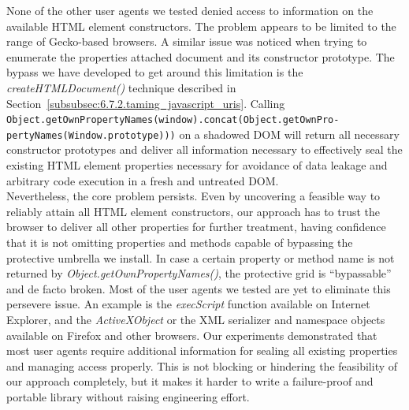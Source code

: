     None of the other user agents we tested denied access to information on the available HTML element constructors. The problem appears to be limited to the range of Gecko-based browsers. A similar issue was noticed when trying to enumerate the properties attached document and its constructor prototype. The bypass we have developed to get around this limitation is the \textit {createHTMLDocument()} technique described in Section~\ref{subsubsec:6.7.2.taming_javascript_uris}. Calling \texttt{Object.getOwnPropertyNames(window).concat(Object.getOwnPro-\\
pertyNames(Window.prototype)))} on a shadowed DOM will return all necessary constructor prototypes and deliver all information necessary to effectively seal the existing HTML element properties necessary for avoidance of data leakage and arbitrary code execution in a fresh and untreated DOM.\\

    Nevertheless, the core problem persists. Even by uncovering a feasible way to reliably attain all HTML element constructors, our approach has to trust the browser to deliver all other properties for further treatment, having confidence that it is not omitting properties and methods capable of bypassing the protective umbrella we install. In case a certain property or method name is not returned by \textit{Object.getOwnPropertyNames()}, the protective grid is ``bypassable'' and de facto broken. Most of the user agents we tested are yet to eliminate this persevere issue. An example is the \textit{execScript} function available on Internet Explorer, and the \textit{ActiveXObject} or the XML serializer and namespace objects available on Firefox and other browsers. Our experiments demonstrated that most user agents require additional information for sealing all existing properties and managing access properly. This is not blocking or hindering the feasibility of our approach completely, but it makes it harder to write a failure-proof and portable library without raising engineering effort. \\

